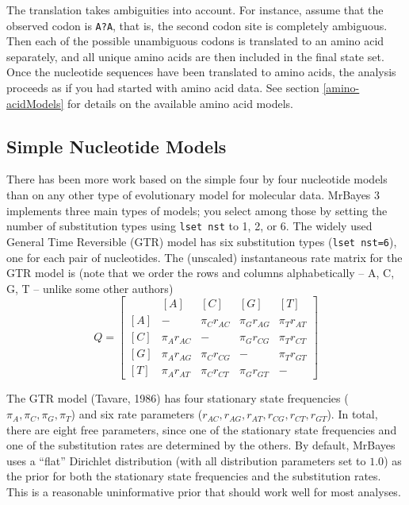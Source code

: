 \documentclass[12pt]{book}
\begin{document}
The translation takes ambiguities into account. For instance, assume that the observed codon is
\texttt{A?A}, that is, the second codon site is completely ambiguous. Then each of the possible
unambiguous codons is translated to an amino acid separately, and all unique amino acids are then
included in the final state set. Once the nucleotide sequences have been translated to amino acids,
the analysis proceeds as if you had started with amino acid data. See section
\ref{amino-acidModels} for details on the available amino acid models.

\subsection{Simple Nucleotide Models}

There has been more work based on the simple four by four nucleotide models than on any other type
of evolutionary model for molecular data. MrBayes 3 implements three main types of models; you
select among those by setting the number of substitution types using \texttt{lset nst} to 1, 2, or
6.  The widely used General Time Reversible (GTR) model has six substitution types (\texttt{lset
nst=6}), one for each pair of nucleotides. The (unscaled) instantaneous rate matrix for the GTR
model is (note that we order the rows and columns alphabetically -- A, C, G, T -- unlike some other
authors)
\[ Q=\begin{bmatrix}
    & [A] & [C] & [G] & [T]\\
    [A]& - & \pi_C r_{AC} & \pi_G r_{AG} & \pi_T r_{AT}\\
    [C]& \pi_A r_{AC} & - & \pi_G r_{CG} &\pi_T r_{CT}\\
    [G]& \pi_A r_{AG} & \pi_C r_{CG}& - & \pi_T r_{GT}\\
    [T]& \pi_A r_{AT} & \pi_C r_{CT}&\pi_G r_{GT} & -
\end{bmatrix}
\]

The GTR model (Tavare, 1986) has four stationary state frequencies ($\pi_A, \pi_C, \pi_G, \pi_T$)
and six rate parameters ($r_{AC}, r_{AG}, r_{AT}, r_{CG}, r_{CT}, r_{GT}$). In total, there are
eight free parameters, since one of the stationary state frequencies and one of the substitution
rates are determined by the others. By default, MrBayes uses a ``flat'' Dirichlet distribution
(with all distribution parameters set to $1.0$) as the prior for both the stationary state
frequencies and the substitution rates. This is a reasonable uninformative prior that should work
well for most analyses.
\end{document}

